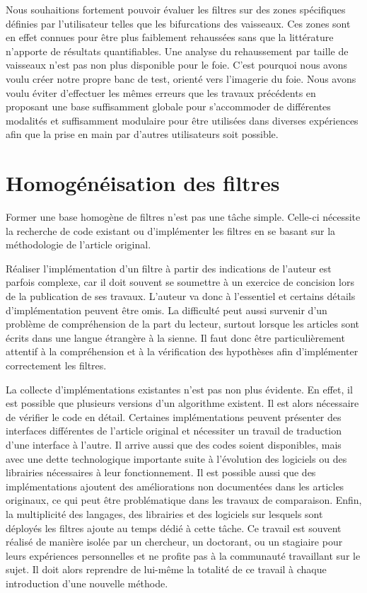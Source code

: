 Nous souhaitions fortement pouvoir évaluer les filtres sur des zones spécifiques définies par l'utilisateur telles que les bifurcations des vaisseaux. Ces zones sont en effet connues pour être plus faiblement rehaussées sans que la littérature n'apporte de résultats quantifiables. Une analyse du rehaussement par taille de vaisseaux n'est pas non plus disponible pour le foie. C'est pourquoi nous avons voulu créer notre propre banc de test, orienté vers l'imagerie du foie. Nous avons voulu éviter d'effectuer les mêmes erreurs que les travaux précédents en proposant une base suffisamment globale pour s'accommoder de différentes modalités et suffisamment modulaire pour être utilisées dans diverses expériences afin que la prise en main par d'autres utilisateurs soit possible.

\section{Homogénéisation des filtres}
\label{sec:Filtres}

Former une base homogène de filtres n'est pas une tâche simple. Celle-ci nécessite la recherche de code existant ou d'implémenter les filtres en se basant sur la méthodologie de l'article original.

Réaliser l'implémentation d'un filtre à partir des indications de l'auteur est parfois complexe, car il doit souvent se soumettre à un exercice de concision lors de la publication de ses travaux. L'auteur va donc à l'essentiel et certains détails d'implémentation peuvent être omis. La difficulté peut aussi survenir d'un problème de compréhension de la part du lecteur, surtout lorsque les articles sont écrits dans une langue étrangère à la sienne. Il faut donc être particulièrement attentif à la compréhension et à la vérification des hypothèses afin d'implémenter correctement les filtres. 

La collecte d'implémentations existantes n'est pas non plus évidente. En effet, il est possible que plusieurs versions d'un algorithme existent. Il est alors nécessaire de vérifier le code en détail. Certaines implémentations peuvent présenter des interfaces différentes de l'article original et nécessiter un travail de traduction d'une interface à l'autre. Il arrive aussi que des codes soient disponibles, mais avec une dette technologique importante suite à l'évolution des logiciels ou des librairies nécessaires à leur fonctionnement. Il est possible aussi que des implémentations ajoutent des améliorations non documentées dans les articles originaux, ce qui peut être problématique dans les travaux de comparaison. Enfin, la multiplicité des langages, des librairies et des logiciels sur lesquels sont déployés les filtres ajoute au temps dédié à cette tâche. Ce travail est souvent réalisé de manière isolée par un chercheur, un doctorant, ou un stagiaire pour leurs expériences personnelles et ne profite pas à la communauté travaillant sur le sujet. Il doit alors reprendre de lui-même la totalité de ce travail à chaque introduction d'une nouvelle méthode.

